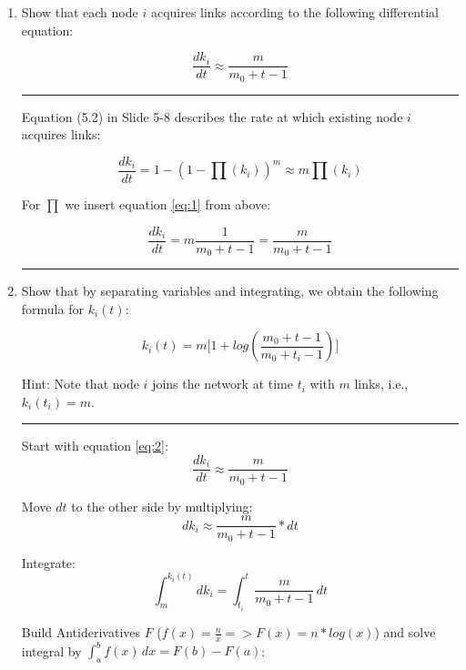 \begin{enumerate}
	\item Show that each node $i$ acquires links according to the following differential equation:
	
	\begin{equation}  \label{eq:2}
		\frac{dk_i}{dt} \approx \frac{m}{m_0 + t - 1}
	\end{equation}
	
	\hrule \relax
	
	Equation (5.2) in Slide 5-8 describes the rate at which existing node $i$ acquires links:
	
	\begin{equation}
		\frac{dk_i}{dt} = 1 - (1 - \prod(k_i))^m \approx m \prod(k_i)
	\end{equation}
	
	For $\prod$ we insert equation \ref{eq:1} from above:
	
	\begin{equation}
		\frac{dk_i}{dt} = m \frac{1}{m_0 + t - 1} = \frac{m}{m_0 + t - 1}
	\end{equation}
	
	\hrule \relax
	
	\item Show that by separating variables and integrating, we obtain the following formula for $k_i(t)$:
	
	\begin{equation} \label{eq:3}
		k_i(t) = m \biggl[1 + log(\frac{m_0 + t - 1}{m_0 + t_i - 1}) \biggr]
	\end{equation}
	
	Hint: Note that node $i$ joins the network at time $t_i$ with $m$ links, i.e., $k_i(t_i) = m$.
	
	\hrule \relax
	
	Start with equation \ref{eq:2}:
	\begin{equation*}
		\frac{dk_i}{dt} \approx \frac{m}{m_0 + t - 1}
	\end{equation*}
	
	Move $dt$ to the other side by multiplying:
	\begin{equation*}
		dk_i \approx \frac{m}{m_0 + t - 1} * dt
	\end{equation*}
	
	Integrate:
	\begin{equation*}
		\int_{m}^{k_i(t)} dk_i = \int_{t_i}^{t} \frac{m}{m_0 + t - 1} \,dt
	\end{equation*}
	
	Build Antiderivatives $F$ ($f(x) = \frac{n}{x} => F(x) = n * log(x)$) and solve integral by $\int_{a}^{b} f(x) \,dx = F(b) - F(a)$:
	

\end{enumerate}
